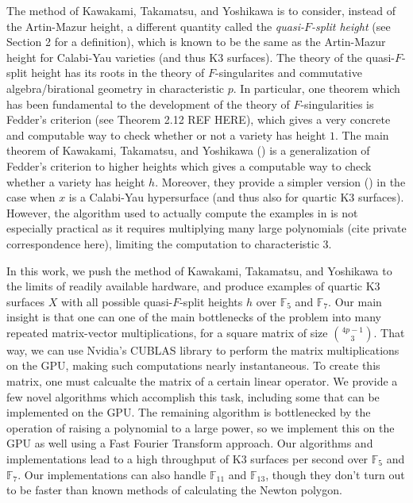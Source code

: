The method of Kawakami, Takamatsu, and Yoshikawa is
to consider, instead of the Artin-Mazur height,
a different quantity called the
\textit{quasi-\(F\)-split height} 
(see Section 2 for a definition),
which is known to be the same as the Artin-Mazur height
for Calabi-Yau varieties (and thus K3 surfaces).
The theory of the quasi-\(F\)-split height has its
roots in the theory of \(F\)-singularites and commutative
algebra/birational geometry in characteristic \(p\).
In particular, one theorem which has been fundamental
to the development of the theory of \(F\)-singularities
is Fedder's criterion (see Theorem 2.12 REF HERE), 
which gives a very concrete and computable way to check
whether or not a variety has height \(1\).
The main theorem of Kawakami, Takamatsu, and Yoshikawa
(\cite[Theorem~A]{kty-2022-fedder})
is a generalization of Fedder's criterion
to higher heights which gives a 
computable way to check whether a variety has height \(h\).
Moreover, they provide a simpler version
(\cite[Theorem~C]{kty-2022-fedder})
in the case when \(x\) is a Calabi-Yau hypersurface
(and thus also for quartic K3 surfaces).
However, the algorithm used to actually compute the examples
in \cite{kty-2022-fedder} is not especially practical
as it requires multiplying many large polynomials
(cite private correspondence here),
limiting the computation 
to characteristic \(3\).

In this work, we push the method of Kawakami,
Takamatsu, and Yoshikawa to the limits of readily
available hardware, 
and produce examples of quartic K3 surfaces \(X\) with all
possible quasi-\(F\)-split heights \(h\) 
over \(\mathbb{F}_{5}\) and \(\mathbb{F}_{7}\).
Our main insight is that one can one of the main
bottlenecks of the problem into many repeated matrix-vector
multiplications, for a square matrix of size 
\(\binom{4p-1}{3}\).
That way, we can use Nvidia's CUBLAS library 
\cite{nvidia-2024-cublas}
to perform the matrix multiplications
on the GPU, making such computations
nearly instantaneous.
To create this matrix, one must calcualte the matrix of a
certain linear operator.
We provide a few novel algorithms which accomplish this task,
including some that can be implemented on the GPU.
The remaining algorithm is bottlenecked by the operation
of raising a polynomial to a large power, 
so we implement this on the GPU as well using 
a Fast Fourier Transform approach.
Our algorithms and implementations lead to a high throughput
of K3 surfaces per second over \(\mathbb{F}_{5}\) and
\(\mathbb{F}_{7}\).
Our implementations can also handle \(\mathbb{F}_{11}\) 
and \(\mathbb{F}_{13}\), though
they don't turn out to be faster than known methods of
calculating the Newton polygon.


